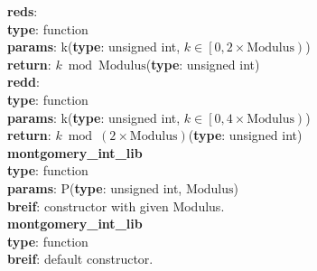 \documentclass[8pt, a4paper, oneside, twocolumn]{article}
\begin{document}
\textbf{reds}:\\
\indent\textbf{type}: function\\
\indent\textbf{params}: k(\textbf{type}: unsigned int, $k\in \left[0,2\times \mathrm{Modulus}\right)$)\\
\indent\textbf{return}: $k\bmod \mathrm{Modulus}$(\textbf{type}: unsigned int)\\
\textbf{redd}:\\
\indent\textbf{type}: function\\
\indent\textbf{params}: k(\textbf{type}: unsigned int, $k\in \left[0,4\times \mathrm{Modulus}\right)$)\\
\indent\textbf{return}: $k\bmod \left(2\times\mathrm{Modulus}\right)$(\textbf{type}: unsigned int)\\
\textbf{montgomery\_int\_lib}\\
\indent\textbf{type}: function\\
\indent\textbf{params}: P(\textbf{type}: unsigned int, $\mathrm{Modulus}$)\\
\indent\textbf{breif}: constructor with given Modulus.\\
\textbf{montgomery\_int\_lib}\\
\indent\textbf{type}: function\\
\indent\textbf{breif}: default constructor.\\
\end{document}
